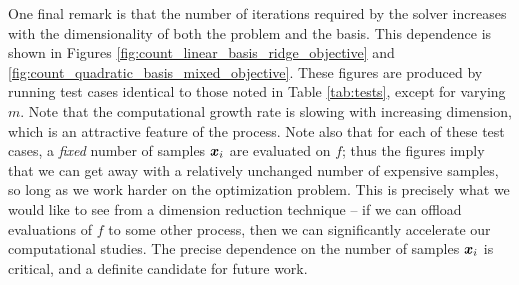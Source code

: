 \documentclass[]{aiaa-tc}%
\begin{document}
One final remark is that the number of iterations required by the solver increases with the dimensionality of both the problem and the basis. This dependence is shown in Figures \ref{fig:count_linear_basis_ridge_objective} and \ref{fig:count_quadratic_basis_mixed_objective}. These figures are produced by running test cases identical to those noted in Table \ref{tab:tests}, except for varying $m$. Note that the computational growth rate is slowing with increasing dimension, which is an attractive feature of the process. Note also that for each of these test cases, a \emph{fixed} number of samples $\boldsymbol{x}_i$ are evaluated on $f$; thus the figures imply that we can get away with a relatively unchanged number of expensive samples, so long as we work harder on the optimization problem. This is precisely what we would like to see from a dimension reduction technique -- if we can offload evaluations of $f$ to some other process, then we can significantly accelerate our computational studies. The precise dependence on the number of samples $\boldsymbol{x}_i$ is critical, and a definite candidate for future work.
\end{document}
